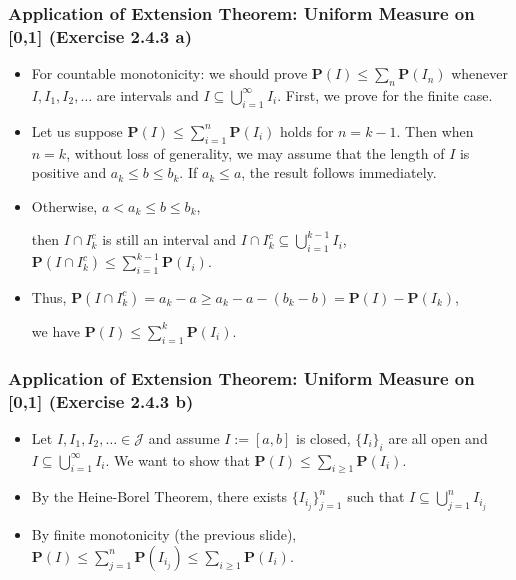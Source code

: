 \documentclass[handout]{beamer}
\newcommand{\BP}{\mathbf{P}}
\begin{document}
\frame
{
  \frametitle{Application of  Extension Theorem: Uniform Measure on [0,1] (Exercise 2.4.3 a) }

   \begin{itemize}


\item<1-> For countable monotonicity:  we should prove $\BP(I)\leq \sum_{n} \BP(I_n)$ whenever $I,I_1,I_2,\ldots$ are intervals and $I \subseteq \bigcup_{i=1}^\infty I_i$. First, we prove for the finite case.


\item<2->  Let us suppose $\BP(I)\leq \sum_{i=1}^n \BP(I_i)$ holds for $n=k-1$. Then when $n=k$, without loss of generality, we may assume that the length of $I$ is positive and $a_k\leq b \leq b_k$. If $a_k\leq a $, the result follows immediately. 
\item<3->[-]Otherwise, $a<a_k\leq b\leq b_k$, 

then $I\cap I_k^c$ is still an interval and $I\cap I_k^c \subseteq \bigcup_{i=1}^{k-1} I_i $, $\BP(I\cap I_k^c)\leq \sum_{i=1}^{k-1} \BP(I_i)$.   
\item<4->[-]Thus, $\BP(I \cap I_k^c)=a_k-a\geq a_k-a - (b_k - b)=\BP(I)-\BP(I_k)$, 

we have $\BP(I)\leq \sum_{i=1}^k \BP(I_i)$.

                   \end{itemize}
}


\frame
{
  \frametitle{Application of  Extension Theorem: Uniform Measure on [0,1] (Exercise 2.4.3 b)}

   \begin{itemize}


\item<1->[-] Let $I, I_1, I_2, \ldots \in \mathcal{J}$ and assume $I := [a,b]$ is closed, $\{I_i\}_i$ are all open and $I \subseteq \bigcup_{i=1}^{\infty}I_i$. We want to show that $\BP(I) \le \sum_{i\ge1}\BP(I_i)$. 

\item<2->[-] By the Heine-Borel Theorem, there exists $\{I_{i_j}\}_{j=1}^n$ such that $I \subseteq \bigcup_{j=1}^{n} I_{i_j}$

\item<3->[-] By finite monotonicity (the previous slide), $\BP(I) \leq  \sum_{j=1}^n \BP( I_{i_j} ) \le \sum_{i\ge1}\BP(I_i).$


\end{itemize}
}
\end{document}
